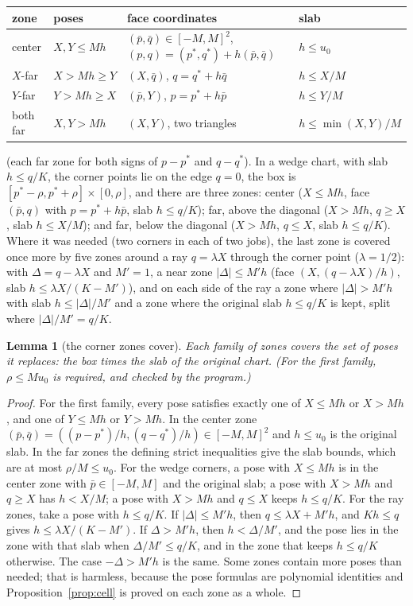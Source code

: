 \documentclass[11pt]{amsart}
\newtheorem{lemma}[theorem]{Lemma}
\theoremstyle{definition}
\theoremstyle{remark}
\begin{document}
\begin{center}
\begin{tabular}{llll}
\toprule
zone & poses & face coordinates & slab \\
\midrule
center & $X,Y\le Mh$ & $(\bar p,\bar q)\in[-M,M]^2$, $(p,q)=(p^*,q^*)+h(\bar p,\bar q)$ & $h\le u_0$\\
$X$-far & $X>Mh\ge Y$ & $(X,\bar q)$, $q=q^*+h\bar q$ & $h\le X/M$\\
$Y$-far & $Y>Mh\ge X$ & $(\bar p,Y)$, $p=p^*+h\bar p$ & $h\le Y/M$\\
both far & $X,Y>Mh$ & $(X,Y)$, two triangles & $h\le\min(X,Y)/M$\\
\bottomrule
\end{tabular}
\end{center}

\noindent (each far zone for both signs of $p-p^*$ and $q-q^*$). In a wedge chart, with slab $h\le q/K$, the
corner points lie on the edge $q=0$, the box is $[p^*-\rho,p^*+\rho]\times[0,\rho]$, and there are three zones:
center ($X\le Mh$, face $(\bar p,q)$ with $p=p^*+h\bar p$, slab $h\le q/K$); far, above the diagonal ($X>Mh$,
$q\ge X$, slab $h\le X/M$); and far, below the diagonal ($X>Mh$, $q\le X$, slab $h\le q/K$). Where it was needed (two corners in each of two jobs), the last zone is covered once more by five zones around a ray $q=\lambda X$ through the corner
point ($\lambda=1/2$): with $\Delta=q-\lambda X$ and $M'=1$, a near zone $|\Delta|\le M'h$ (face $(X,(q-\lambda X)/h)$, slab
$h\le\lambda X/(K-M')$), and on each side of the ray a zone where $|\Delta|>M'h$ with slab $h\le|\Delta|/M'$ and a zone
where the original slab $h\le q/K$ is kept, split where $|\Delta|/M'=q/K$.

\begin{lemma}[the corner zones cover]\label{lem:corners}
Each family of zones covers the set of poses it replaces: the box times the slab of the original chart. (For the
first family, $\rho\le Mu_0$ is required, and checked by the program.)
\end{lemma}

\begin{proof}
For the first family, every pose satisfies exactly one of $X\le Mh$ or $X>Mh$, and one of $Y\le Mh$ or $Y>Mh$. In
the center zone $(\bar p,\bar q)=((p-p^*)/h,(q-q^*)/h)\in[-M,M]^2$ and $h\le u_0$ is the original slab. In the far
zones the defining strict inequalities give the slab bounds, which are at most $\rho/M\le u_0$. For the wedge
corners, a pose with $X\le Mh$ is in the center zone with $\bar p\in[-M,M]$ and the original slab; a pose with $X>Mh$
and $q\ge X$ has $h<X/M$; a pose with $X>Mh$ and $q\le X$ keeps $h\le q/K$. For the ray zones, take a pose with
$h\le q/K$. If $|\Delta|\le M'h$, then $q\le\lambda X+M'h$, and $Kh\le q$ gives $h\le\lambda X/(K-M')$. If $\Delta>M'h$,
then $h<\Delta/M'$, and the pose lies in the zone with that slab when $\Delta/M'\le q/K$, and in the zone that keeps
$h\le q/K$ otherwise. The case $-\Delta>M'h$ is the same. Some zones contain more poses than needed; that is harmless,
because the pose formulas are polynomial identities and Proposition~\ref{prop:cell} is proved on each zone as a
whole.
\end{proof}
\end{document}

